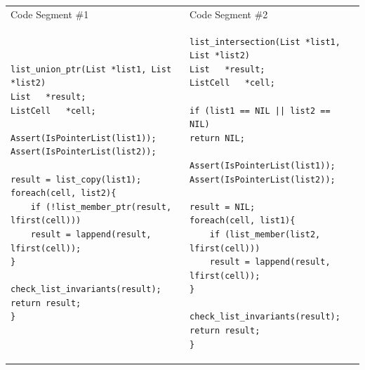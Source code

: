 \documentclass{sig-alternate}
\begin{document}
\noindent
\begin{table}
\begin{tabular}{p{8.5cm}p{8.2cm}}
Code Segment \#1  &  Code Segment \#2  \\
\begin{lstlisting}
list_union_ptr(List *list1, List *list2)
List   *result;
ListCell   *cell;

Assert(IsPointerList(list1));
Assert(IsPointerList(list2));

result = list_copy(list1);
foreach(cell, list2){
    if (!list_member_ptr(result, lfirst(cell)))
    result = lappend(result, lfirst(cell));
}

check_list_invariants(result);
return result;
}
\end{lstlisting}&
\begin{lstlisting}
list_intersection(List *list1, List *list2)
List   *result;
ListCell   *cell;

if (list1 == NIL || list2 == NIL)
return NIL;

Assert(IsPointerList(list1));
Assert(IsPointerList(list2));

result = NIL;
foreach(cell, list1){
    if (list_member(list2, lfirst(cell)))
    result = lappend(result, lfirst(cell));
}

check_list_invariants(result);
return result;
}
\end{lstlisting}
\end{tabular} 
\end{table}
\end{document}
